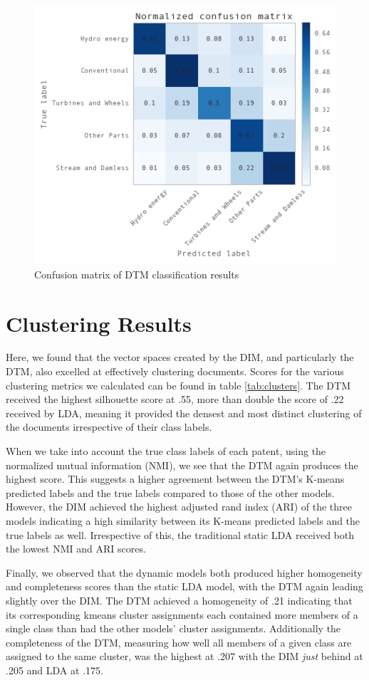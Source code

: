 \begin{figure}[!htb]
\centering
\includegraphics[scale=0.65]{Figures/dtmclass}
\decoRule
\caption[dtmclass]{Confusion matrix of DTM classification results}
\label{fig:DTMmatrix}
\end{figure}


\section{Clustering Results}
\label{clusres}
Here, we found that the vector spaces created by the DIM, and particularly the DTM, also excelled at effectively clustering documents. Scores for the various clustering metrics we calculated can be found in table \ref{tab:clusters}. The DTM received the highest silhouette score at .55, more than double the score of .22 received by LDA, meaning it provided the densest and most distinct clustering of the documents irrespective of their class labels.

When we take into account the true class labels of each patent, using the normalized mutual information (NMI), we see that the DTM again produces the highest score. This suggests a higher agreement between the DTM's K-means predicted labels and the true labels compared to those of the other models. However, the DIM achieved the highest adjusted rand index (ARI) of the three models indicating a high similarity between its K-means predicted labels and the true labels as well. Irrespective of this, the traditional static LDA received both the lowest NMI and ARI scores.

Finally, we observed that the dynamic models both produced higher homogeneity and completeness scores than the static LDA model, with the DTM again leading slightly over the DIM. The DTM achieved a homogeneity of .21 indicating that its corresponding kmeans cluster assignments each contained more members of a single class than had the other models' cluster assignments. Additionally the completeness of the DTM, measuring how well all members of a given class are assigned to the same cluster, was the highest at .207 with the DIM \emph{just} behind at .205 and LDA at .175.

